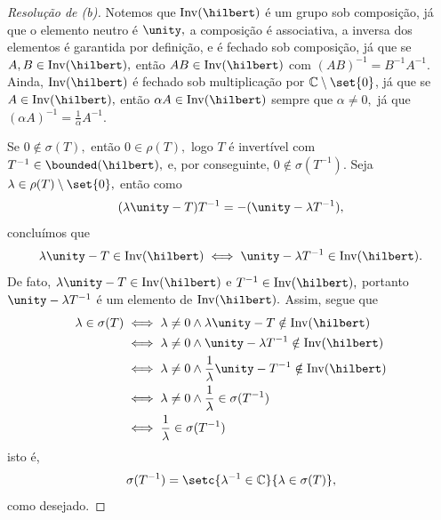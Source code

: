 \begin{proof}[Resolução de (b)]
  Notemos que \(\mathrm{Inv}(\hilbert)\) é um grupo sob composição, já que o elemento neutro é \(\unity,\) a composição é associativa, a inversa dos elementos é garantida por definição, e é fechado sob composição, já que se \(A, B \in \mathrm{Inv}(\hilbert),\) então \(AB \in \mathrm{Inv}(\hilbert)\) com \((AB)^{-1} = B^{-1} A^{-1}.\) Ainda, \(\mathrm{Inv}(\hilbert)\) é fechado sob multiplicação por \(\mathbb{C} \setminus \set{0}\), já que se \(A \in \mathrm{Inv}(\hilbert),\) então \(\alpha A \in \mathrm{Inv}(\hilbert)\) sempre que \(\alpha \neq 0,\) já que \((\alpha A)^{-1} = \frac{1}{\alpha} A^{-1}.\)

  Se \(0 \notin \sigma(T),\) então \(0 \in \rho(T),\) logo \(T\) é invertível com \(T^{-1} \in \bounded(\hilbert),\) e, por conseguinte, \(0 \notin \sigma(T^{-1}).\) Seja \(\lambda \in \rho(T) \setminus \set{0},\) então como
  \begin{equation*}
    (\lambda \unity - T) T^{-1} = -(\unity - \lambda T^{-1}),
  \end{equation*}
  concluímos que
  \begin{equation*}
    \lambda \unity - T \in \mathrm{Inv}(\hilbert) \iff \unity - \lambda T^{-1} \in \mathrm{Inv}(\hilbert).
  \end{equation*}
  De fato, \(\lambda \unity - T \in \mathrm{Inv}(\hilbert)\) e \(T^{-1} \in \mathrm{Inv}(\hilbert),\) portanto \(\unity - \lambda T^{-1}\) é um elemento de \(\mathrm{Inv}(\hilbert).\) Assim, segue que
  \begin{align*}
    \lambda \in \sigma(T) &\iff \lambda \neq 0 \land \lambda\unity - T \notin \mathrm{Inv}(\hilbert)\\
                          &\iff \lambda \neq 0 \land \unity - \lambda T^{-1} \notin \mathrm{Inv}(\hilbert)\\
                          &\iff \lambda \neq 0 \land \frac{1}{\lambda} \unity - T^{-1} \notin \mathrm{Inv}(\hilbert)\\
                          &\iff \lambda \neq 0 \land \frac{1}{\lambda} \in \sigma(T^{-1})\\
                          &\iff \frac{1}{\lambda} \in \sigma(T^{-1})
  \end{align*}
  isto é,
  \begin{equation*}
    \sigma(T^{-1}) = \setc{\lambda^{-1} \in \mathbb{C}}{\lambda \in \sigma(T)},
  \end{equation*}
  como desejado.
\end{proof}
